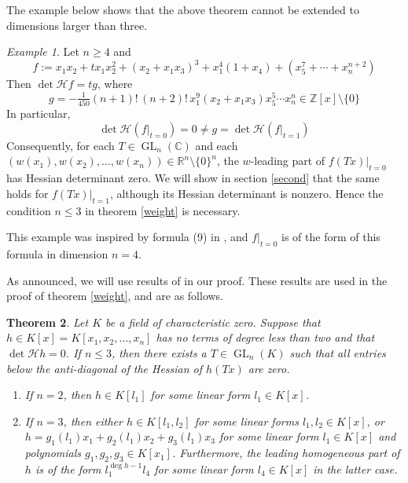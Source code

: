 \documentclass[10pt]{article}
\newtheorem{theorem}{Theorem}[section]
\theoremstyle{remark}
\newtheorem{example}[theorem]{Example}
\theoremstyle{definition}
\newcommand{\hess}{{\mathcal H}}
\newcommand{\GL}{\operatorname{GL}}
\newcommand{\C}{{\mathbb C}}
\newcommand{\R}{{\mathbb R}}
\newcommand{\Z}{{\mathbb Z}}
\begin{document}
\noindent
The example below shows that the above theorem cannot be extended to dimensions larger than three.

\begin{example} \label{weightcounter}
Let $n \ge 4$ and
$$
f := x_1 x_2 + t x_1 x_2^2 + (x_2 + x_1 x_3)^3 + x_1^4 (1 + x_4) +
     (x_5^7 + \cdots + x_n^{n+2})
$$
Then $\det \hess f =  t g$, where 
$$
g = -\tfrac1{450} (n+1)!\, (n+2)!\, x_1^9(x_2 + x_1 x_3) x_5^5 \cdots x_n^n
\in \Z[x] \setminus \{0\}
$$
In particular,
$$
\det \hess (f|_{t=0}) = 0 \ne g = \det \hess (f|_{t=1})
$$
Consequently, for each 
$T \in \GL_n(\C)$ and each $(w(x_1),w(x_2),\ldots,w(x_n)) \in \R^n \setminus \{0\}^n$, the 
$w$-leading part of $f(Tx)|_{t=0}$ has Hessian determinant zero. We will show in section \ref{second} 
that the same holds for $f(Tx)|_{t=1}$, although its Hessian determinant is nonzero.
Hence the condition $n \le 3$ in theorem \ref{weight} is necessary. 

This example was inspired by formula (9) in \cite[Th.\@ 3.5]{MR2095579}, and $f|_{t=0}$ is of the form
of this formula in dimension $n = 4$.
\end{example}

\noindent
As announced, we will use results of \cite{MR2095579} in our proof. These results are used in the proof of 
theorem \ref{weight}, and are as follows.

\begin{theorem} \label{zerohess}
Let $K$ be a field of characteristic zero. Suppose that $h \in K[x] = K[x_1,x_2,\ldots,x_n]$
has no terms of degree less than two and that $\det \hess h = 0$. If $n \le 3$, then there exists a 
$T \in \GL_n(K)$ such that all entries below the anti-diagonal of the Hessian of $h(Tx)$ are zero.
\begin{enumerate}

\item[i)] If $n = 2$, then $h \in K[l_1]$ for some linear form $l_1 \in K[x]$.

\item[ii)] If $n = 3$, then either $h \in K[l_1,l_2]$ for some linear forms 
$l_1, l_2 \in K[x]$, or $h = g_1(l_1) x_1 + g_2(l_1) x_2 + g_3(l_1)x_3$ for some
linear form $l_1 \in K[x]$ and polynomials $g_1, g_2, g_3 \in K[x_1]$. 
Furthermore, the leading homogeneous part of $h$ is of the form $l_1^{\deg h - 1} l_4$ for 
some linear form $l_4 \in K[x]$ in the latter case.

\end{enumerate}
\end{theorem}
\end{document}
